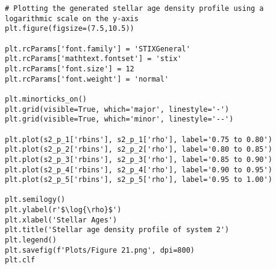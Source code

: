 \documentclass[12pt, a4paper]{article}
\begin{document}
\begin{lstlisting}[language=iPython]
# Plotting the generated stellar age density profile using a logarithmic scale on the y-axis
plt.figure(figsize=(7.5,10.5))
  
plt.rcParams['font.family'] = 'STIXGeneral'
plt.rcParams['mathtext.fontset'] = 'stix'
plt.rcParams['font.size'] = 12
plt.rcParams['font.weight'] = 'normal'
  
plt.minorticks_on()
plt.grid(visible=True, which='major', linestyle='-')
plt.grid(visible=True, which='minor', linestyle='--')
  
plt.plot(s2_p_1['rbins'], s2_p_1['rho'], label='0.75 to 0.80')
plt.plot(s2_p_2['rbins'], s2_p_2['rho'], label='0.80 to 0.85')
plt.plot(s2_p_3['rbins'], s2_p_3['rho'], label='0.85 to 0.90')
plt.plot(s2_p_4['rbins'], s2_p_4['rho'], label='0.90 to 0.95')
plt.plot(s2_p_5['rbins'], s2_p_5['rho'], label='0.95 to 1.00')
  
plt.semilogy()
plt.ylabel(r'$\log{\rho}$')
plt.xlabel('Stellar Ages')
plt.title('Stellar age density profile of system 2')
plt.legend()
plt.savefig(f'Plots/Figure 21.png', dpi=800)
plt.clf
  
\end{lstlisting}
\end{document}
